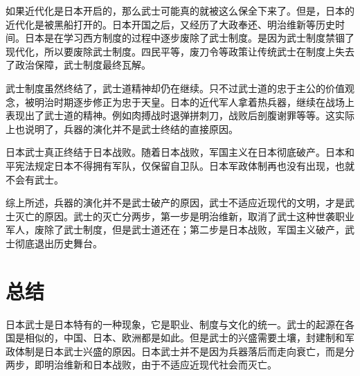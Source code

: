 \documentclass[utf8]{ctexart}
\begin{document}
如果近代化是日本开启的，那么武士可能真的就被这么保全下来了。但是，日本的近代化是被黑船打开的。日本开国之后，又经历了大政奉还、明治维新等历史时间。日本是在学习西方制度的过程中逐步废除了武士制度。是因为武士制度禁锢了现代化，所以要废除武士制度。四民平等，废刀令等政策让传统武士在制度上失去了政治保障，武士制度最终瓦解。

武士制度虽然终结了，武士道精神却仍在继续。只不过武士道的忠于主公的价值观念，被明治时期逐步修正为忠于天皇。日本的近代军人拿着热兵器，继续在战场上表现出了武士道的精神。例如肉搏战时退弹拼刺刀，战败后剖腹谢罪等等。这实际上也说明了，兵器的演化并不是武士终结的直接原因。

日本武士真正终结于日本战败。随着日本战败，军国主义在日本彻底破产。日本和平宪法规定日本不得拥有军队，仅保留自卫队。日本军政体制再也没有出现，也就不会有武士。

综上所述，兵器的演化并不是武士破产的原因，武士不适应近现代的文明，才是武士灭亡的原因。武士的灭亡分两步，第一步是明治维新，取消了武士这种世袭职业军人，废除了武士制度，但是武士道还在；第二步是日本战败，军国主义破产，武士彻底退出历史舞台。

\section{总结}
日本武士是日本特有的一种现象，它是职业、制度与文化的统一。武士的起源在各国是相似的，中国、日本、欧洲都是如此。但是武士的兴盛需要土壤，封建制和军政体制是日本武士兴盛的原因。日本武士并不是因为兵器落后而走向衰亡，而是分两步，即明治维新和日本战败，由于不适应近现代社会而灭亡。




\newpage
\end{document}
